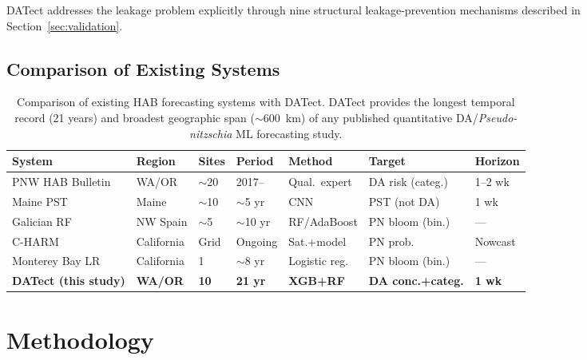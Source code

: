 \documentclass[toxins,article,submit,moreauthors]{Definitions/mdpi}
\begin{document}
DATect addresses the leakage problem explicitly through nine structural leakage-prevention mechanisms described in Section~\ref{sec:validation}.

\subsection{Comparison of Existing Systems}
\label{sec:rw-comparison}

\begin{table}[H]
\caption{Comparison of existing HAB forecasting systems with DATect. DATect provides the longest temporal record (21 years) and broadest geographic span ($\sim$\SI{600}{\kilo\meter}) of any published quantitative DA/\textit{Pseudo-nitzschia} ML forecasting study.}
\label{tab:system-comparison}
\centering\scriptsize
\begin{tabular*}{\linewidth}{@{\extracolsep{\fill}}lllllll}
\toprule
\textbf{System} & \textbf{Region} & \textbf{Sites} & \textbf{Period} & \textbf{Method} & \textbf{Target} & \textbf{Horizon} \\
\midrule
PNW HAB Bulletin \cite{McCabe2023} & WA/OR & $\sim$20 & 2017-- & Qual.\ expert & DA risk (categ.) & 1--2 wk \\
\addlinespace
Maine PST \cite{Grasso2019} & Maine & $\sim$10 & $\sim$5 yr & CNN & PST (not DA) & 1 wk \\
\addlinespace
Galician RF \cite{Alaez2021} & NW Spain & $\sim$5 & $\sim$10 yr & RF/AdaBoost & PN bloom (bin.) & --- \\
\addlinespace
C-HARM \cite{Anderson2016} & California & Grid & Ongoing & Sat.+model & PN prob. & Nowcast \\
\addlinespace
Monterey Bay LR \cite{Lane2009} & California & 1 & $\sim$8 yr & Logistic reg. & PN bloom (bin.) & --- \\
\addlinespace
\textbf{DATect (this study)} & \textbf{WA/OR} & \textbf{10} & \textbf{21 yr} & \textbf{XGB+RF} & \textbf{DA conc.+categ.} & \textbf{1 wk} \\
\bottomrule
\end{tabular*}
\end{table}


\section{Methodology}
\label{sec:methodology}
\end{document}
